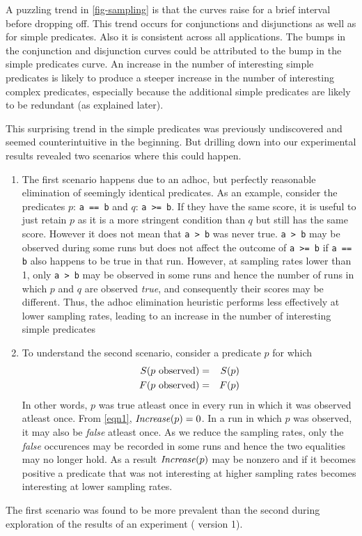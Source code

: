 A puzzling trend in \autoref{fig-sampling} is that the curves raise for a 
brief interval before dropping off.  This trend occurs for conjunctions and 
disjunctions as well as for simple predicates.  Also it is consistent across
all applications.  The bumps in the conjunction and disjunction curves could
be attributed to the bump in the simple predicates curve.  An increase
in the number of interesting simple predicates is likely to produce a steeper 
increase in the number of interesting complex predicates, especially because
the additional simple predicates are likely to be redundant (as explained
later).

This surprising trend in the simple predicates was previously undiscovered
and seemed counterintuitive in the beginning.  But drilling down into our
experimental results revealed two scenarios where this could happen.

\begin{enumerate}
\item The first scenario happens due to an adhoc, but perfectly reasonable
elimination of seemingly identical predicates.  As an example, consider the
predicates $p$: \texttt{a == b} and $q$: \texttt{a >= b}.  If they have the
same score, it is useful to just retain $p$ as it is a more stringent
condition than $q$ but still has the same score.  However it does not mean
that \texttt{a > b} was never true.  \texttt{a > b} may be observed  during 
some runs but does not affect the outcome of \texttt{a >= b} if \texttt{a == b}
also happens to be true in that run.  However, at sampling rates lower than
1, only \texttt{a > b} may be observed in some runs and hence the number of
runs in which $p$ and $q$ are observed \emph{true}, and consequently their
scores may be different.  Thus, the adhoc elimination heuristic performs 
less effectively at lower sampling rates, leading to an increase in the 
number of interesting simple predicates

\item To understand the second scenario, consider a predicate $p$ for which
\begin{eqnarray*}
 S(\text{$p$ observed}) &=& S(p) \\
 F(\text{$p$ observed}) &=& F(p) \\
\end{eqnarray*}
In other words, $p$ was true atleast once in every run in which it was 
observed atleast once.  From \autoref{eqn1}, $\mathit{Increase}(p) = 0$.  In a run 
in which $p$ was observed, it may also be \emph{false} atleast once.  As we
reduce the sampling rates, only the \emph{false} occurences may be recorded
in some runs and hence the two equalities may no longer hold.  As a result
$\mathit{Increase}(p)$ may be nonzero and if it becomes positive a predicate that
was not interesting at higher sampling rates becomes interesting at lower 
sampling rates.
\end{enumerate}

The first scenario was found to be more prevalent than the second during
exploration of the results of an experiment ( version 1).

